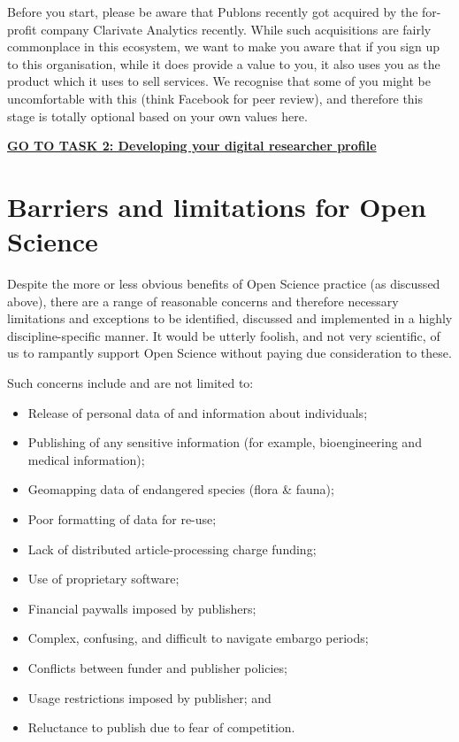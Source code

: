 \documentclass[]{book}
\begin{document}
Before you start, please be aware that Publons recently got acquired by the for-profit company Clarivate Analytics recently. While such acquisitions are fairly commonplace in this ecosystem, we want to make you aware that if you sign up to this organisation, while it does provide a value to you, it also uses you as the product which it uses to sell services. We recognise that some of you might be uncomfortable with this (think Facebook for peer review), and therefore this stage is totally optional based on your own values here.

\href{Task_2.md}{\textbf{GO TO TASK 2: Developing your digital researcher profile}}

\hypertarget{barriers-and-limitations-for-open-science}{%
\section{Barriers and limitations for Open Science }\label{barriers-and-limitations-for-open-science}}

Despite the more or less obvious benefits of Open Science practice (as discussed above), there are a range of reasonable concerns and therefore necessary limitations and exceptions to be identified, discussed and implemented in a highly discipline-specific manner. It would be utterly foolish, and not very scientific, of us to rampantly support Open Science without paying due consideration to these.

Such concerns include and are not limited to:

\begin{itemize}
\item
  Release of personal data of and information about individuals;
\item
  Publishing of any sensitive information (for example, bioengineering and medical information);
\item
  Geomapping data of endangered species (flora \& fauna);
\item
  Poor formatting of data for re-use;
\item
  Lack of distributed article-processing charge funding;
\item
  Use of proprietary software;
\item
  Financial paywalls imposed by publishers;
\item
  Complex, confusing, and difficult to navigate embargo periods;
\item
  Conflicts between funder and publisher policies;
\item
  Usage restrictions imposed by publisher; and
\item
  Reluctance to publish due to fear of competition.
\end{itemize}
\end{document}
